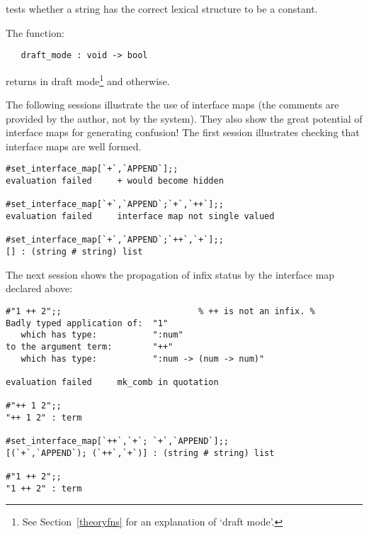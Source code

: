\noindent tests whether a string has the correct lexical structure to be a
constant.

The function:

\begin{boxed}
\begin{verbatim}
   draft_mode : void -> bool
\end{verbatim}\end{boxed}

\noindent returns  in draft mode\footnote{See Section~\ref{theoryfns}
for an explanation of `draft mode'.} and  otherwise.

The following sessions illustrate the use of interface maps (the comments are
provided by the author, not by the system). They
also show the great potential of interface maps for
generating confusion! The first session illustrates checking that
interface maps are well formed.

\setcounter{sessioncount}{1}
\begin{session}\begin{verbatim}
#set_interface_map[`+`,`APPEND`];;
evaluation failed     + would become hidden

#set_interface_map[`+`,`APPEND`;`+`,`++`];;
evaluation failed     interface map not single valued

#set_interface_map[`+`,`APPEND`;`++`,`+`];;
[] : (string # string) list
\end{verbatim}\end{session}

\noindent The next session shows the propagation of infix status by the interface map declared above:

\begin{session}\begin{verbatim}
#"1 ++ 2";;                           % ++ is not an infix. %
Badly typed application of:  "1"
   which has type:           ":num"
to the argument term:        "++"
   which has type:           ":num -> (num -> num)"

evaluation failed     mk_comb in quotation

#"++ 1 2";;
"++ 1 2" : term

#set_interface_map[`++`,`+`; `+`,`APPEND`];;
[(`+`,`APPEND`); (`++`,`+`)] : (string # string) list

#"1 ++ 2";;
"1 ++ 2" : term
\end{verbatim}\end{session}

